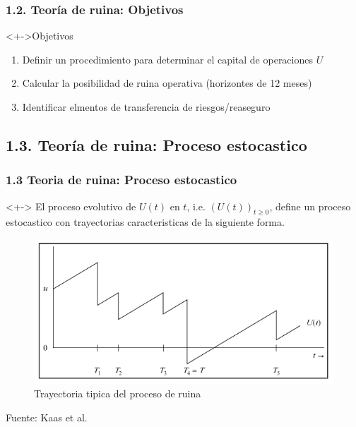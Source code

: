 \documentclass[cjk,t,compress]{beamer}
\begin{document}
\begin{frame}[fragile]
	\frametitle{1.2. Teor\'ia de ruina: Objetivos}
	\scriptsize  	
		
		\vspace{0.1cm}
		\begin{block}<+->{Objetivos}
		\vspace{0.1cm}
		\begin{enumerate}
		  \item Definir un procedimiento para determinar el capital de operaciones $U$
		  \item Calcular la posibilidad de ruina operativa (horizontes de 12 meses)
		  \item Identificar elmentos de transferencia de riesgos/reaseguro
		\end{enumerate}
		\end{block}
		
\end{frame}

%
%
\subsection{1.3. Teor\'ia de ruina: Proceso estocastico}
\begin{frame}[fragile]
	\frametitle{1.3 Teoria de ruina: Proceso estocastico}
	\scriptsize  	
		
		\begin{block}<+->{}
		El proceso evolutivo de $U(t)$ en $t$, i.e. $\left( U(t) \right)_{t\geq 0}$, define un proceso estocastico con trayectorias caracteristicas de la siguiente forma.

		\vspace{0.1cm}
		\begin{figure}[hbtp]
		\caption{Trayectoria tipica del proceso de ruina}
		\centering
		\includegraphics[scale=0.41]{Figuras/Ruin_Process.jpeg}
		\end{figure}
		{\tiny Fuente: Kaas et al.}
		\end{block}  		
	
\end{frame}
\end{document}
